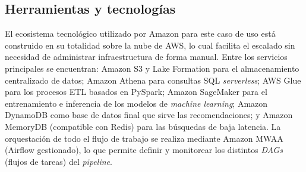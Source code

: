 \documentclass[12pt,a4paper]{article}
\begin{document}
\begin{center}
\end{center}

\subsection{Herramientas y tecnologías}
El ecosistema tecnológico utilizado por Amazon para este caso de uso está
construido en su totalidad sobre la nube de AWS, lo cual facilita el escalado
sin necesidad de administrar infraestructura de forma manual. Entre los
servicios principales se encuentran: Amazon S3 y Lake Formation para el
almacenamiento centralizado de datos; Amazon Athena para consultas SQL
\textit{serverless}; AWS Glue para los procesos ETL basados en PySpark; Amazon
SageMaker para el entrenamiento e inferencia de los modelos de \textit{machine
learning}; Amazon DynamoDB como base de datos final que sirve las
recomendaciones; y Amazon MemoryDB (compatible con Redis) para las búsquedas
de baja latencia. La orquestación de todo el flujo de trabajo se realiza
mediante Amazon MWAA (Airflow gestionado), lo que permite definir y monitorear
los distintos \textit{DAGs} (flujos de tareas) del \textit{pipeline}.
\end{document}
